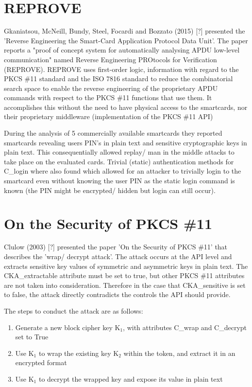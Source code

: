 \documentclass[bsc,frontabs,twoside,singlespacing,parskip,deptreport]{infthesis}     %
\begin{document}
\section{REPROVE}

Gkaniatsou, McNeill, Bundy, Steel, Focardi and Bozzato (2015) [?] presented the 'Reverse Engineering the Smart-Card Application Protocol Data Unit'. The paper reports a "proof of concept system for automatically analysing APDU low-level communication" named Reverse Engineering PROtocols for Verification (REPROVE). REPROVE uses first-order logic, information with regard to the PKCS \#11 standard and the ISO 7816 standard to reduce the combinatorial search space to enable the reverse engineering of the proprietary APDU commands with respect to the PKCS \#11 functions that use them. It accomplishes this without the need to have physical access to the smartcards, nor their proprietary middleware (implementation of the PKCS \#11 API)

During the analysis of 5 commercially available smartcards they reported smartcards revealing users PIN's in plain text and sensitive cryptographic keys in plain text. This consequentially allowed replay/ man in the middle attacks to take place on the evaluated cards. Trivial (static) authentication methods for C\_login where also found which allowed for an attacker to trivially login to the smartcard even without knowing the user PIN as the static login command is known (the PIN might be encrypted/ hidden but login can still occur).


\section{On the Security of PKCS \#11}

Clulow (2003) [?] presented the paper 'On the Security of PKCS \#11' that describes the 'wrap/ decrypt attack'. The attack occurs at the API level and extracts sensitive key values of symmetric and asymmetric keys in plain text. The CKA\_extractable attribute must be set to true, but other PKCS \#11 attributes are not taken into consideration. Therefore in the case that CKA\_sensitive is set to false, the attack directly contradicts the controls the API should provide.

The steps to conduct the attack are as follows:
\begin{enumerate}
\item Generate a new block cipher key K$_1$, with attributes C\_wrap and C\_decrypt set to True
\item Use K$_1$ to wrap the existing key K$_2$ within the token, and extract it in an encrypted format
\item Use K$_1$ to decrypt the wrapped key and expose its value in plain text
\end{enumerate}
\end{document}
